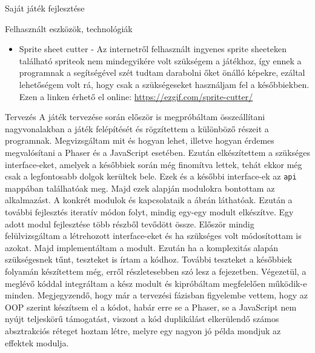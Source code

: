 \begin{MyChapter}{Saját játék fejlesztése}
\begin{MySection}{Felhasznált eszközök, technológiák}
\begin{itemize}
			\item Sprite sheet cutter - Az internetről felhasznált ingyenes sprite sheeteken található spriteok nem mindegyikére volt szükségem a játékhoz, így ennek a programnak a segítségével szét tudtam darabolni őket önálló képekre, ezáltal lehetőségem volt rá, hogy csak a szükségeseket használjam fel a későbbiekben. Ezen a linken érhető el online: \url{https://ezgif.com/sprite-cutter/}
			
		\end{itemize}
		
	\end{MySection}
	
	\begin{MySection}{Tervezés}
		A játék tervezése során először is megpróbáltam összeállítani nagyvonalakban a játék felépítését és rögzítettem a különböző részeit a programnak. Megvizsgáltam mit és hogyan lehet, illetve hogyan érdemes megvalósítani a Phaser és a JavaScript esetében.
		Ezután elkészítettem a szükséges interface-eket, amelyek a későbbiek során még finomítva lettek, tehát ekkor még csak a legfontosabb dolgok kerültek bele. Ezek és a későbbi interface-ek az \texttt{api} mappában találhatóak meg. Majd ezek alapján modulokra bontottam az alkalmazást. A konkrét modulok és kapcsolataik a  ábrán láthatóak. Ezután a további fejlesztés iteratív módon folyt, mindig egy-egy modult elkészítve. Egy adott modul fejlesztése több részből tevődött össze. Először mindig felülvizsgáltam a létrehozott interface-eket és ha szükséges volt módosítottam is azokat. Majd implementáltam a modult. Ezután ha a komplexitás alapán szükségesnek tűnt, teszteket is írtam a kódhoz. További teszteket a későbbiek folyamán készítettem még, erről részletesebben szó lesz a  fejezetben. Végezetül, a meglévő kóddal integráltam a kész modult és kipróbáltam megfelelően működik-e minden. Megjegyzendő, hogy már a tervezési fázisban figyelembe vettem, hogy az OOP szerint készítsem el a kódot, habár erre se a Phaser, se a JavaScript nem nyújt teljeskörű támogatást, viszont a kód duplikálást elkerülendő számos absztrakciós réteget hoztam létre, melyre egy nagyon jó példa mondjuk az effektek modulja.
		

\end{MySection}
\end{MyChapter}
